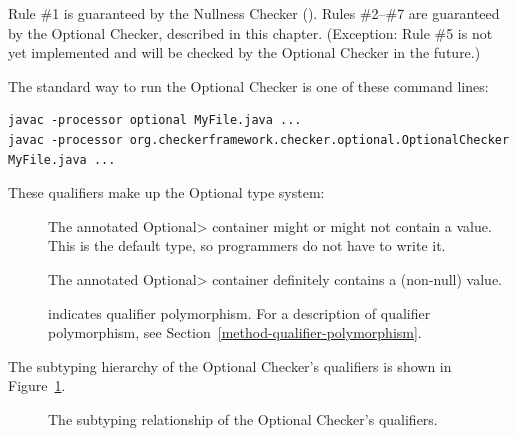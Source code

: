 Rule \#1 is guaranteed by the Nullness Checker
().
Rules \#2--\#7 are guaranteed by the Optional Checker, described in this chapter.
(Exception:  Rule \#5 is not yet implemented and will be checked by the
Optional Checker in the future.)



The standard way to run the Optional Checker is one of these command lines:

\begin{Verbatim}
javac -processor optional MyFile.java ...
javac -processor org.checkerframework.checker.optional.OptionalChecker MyFile.java ...
\end{Verbatim}



These qualifiers make up the Optional type system:

\begin{description}

\item[]
  The annotated \<Optional> container might or might not contain a value.
  This is the default type, so programmers do not have to write it.

\item[]
  The annotated \<Optional> container definitely contains a (non-null) value.

\item[]
  indicates qualifier polymorphism.
  For a description of qualifier polymorphism, see
  Section~\ref{method-qualifier-polymorphism}.

\end{description}

The subtyping hierarchy of the Optional Checker's qualifiers is shown in
Figure~\ref{fig-optional-hierarchy}.

\begin{figure}
\caption{The subtyping relationship of the Optional Checker's qualifiers.}
\label{fig-optional-hierarchy}
\end{figure}

